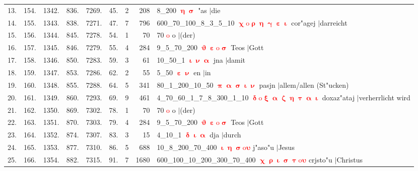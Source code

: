 \documentclass[a4paper,10pt,landscape]{article}
\begin{document}
\begin{tabular}{rrrrrrrrp{120mm}}
13.&154.&1342.&836.&7269.&45.&2&208&8\_200 \textcolor{red}{$\boldsymbol{\upeta\upsigma}$} "as $|$die\\
14.&155.&1343.&838.&7271.&47.&7&796&600\_70\_100\_8\_3\_5\_10 \textcolor{red}{$\boldsymbol{\upchi\mathrm{o}\uprho\upeta\upgamma\upepsilon\upiota}$} cor"agej $|$darreicht\\
15.&156.&1344.&845.&7278.&54.&1&70&70 \textcolor{red}{$\boldsymbol{\mathrm{o}}$} o $|$(der)\\
16.&157.&1345.&846.&7279.&55.&4&284&9\_5\_70\_200 \textcolor{red}{$\boldsymbol{\upvartheta\upepsilon\mathrm{o}\upsigma}$} Teos $|$Gott\\
17.&158.&1346.&850.&7283.&59.&3&61&10\_50\_1 \textcolor{red}{$\boldsymbol{\upiota\upnu\upalpha}$} jna $|$damit\\
18.&159.&1347.&853.&7286.&62.&2&55&5\_50 \textcolor{red}{$\boldsymbol{\upepsilon\upnu}$} en $|$in\\
19.&160.&1348.&855.&7288.&64.&5&341&80\_1\_200\_10\_50 \textcolor{red}{$\boldsymbol{\uppi\upalpha\upsigma\upiota\upnu}$} pasjn $|$allem/allen (St"ucken)\\
20.&161.&1349.&860.&7293.&69.&9&461&4\_70\_60\_1\_7\_8\_300\_1\_10 \textcolor{red}{$\boldsymbol{\updelta\mathrm{o}\upxi\upalpha\upzeta\upeta\uptau\upalpha\upiota}$} doxaz"ataj $|$verherrlicht wird\\
21.&162.&1350.&869.&7302.&78.&1&70&70 \textcolor{red}{$\boldsymbol{\mathrm{o}}$} o $|$(der)\\
22.&163.&1351.&870.&7303.&79.&4&284&9\_5\_70\_200 \textcolor{red}{$\boldsymbol{\upvartheta\upepsilon\mathrm{o}\upsigma}$} Teos $|$Gott\\
23.&164.&1352.&874.&7307.&83.&3&15&4\_10\_1 \textcolor{red}{$\boldsymbol{\updelta\upiota\upalpha}$} dja $|$durch\\
24.&165.&1353.&877.&7310.&86.&5&688&10\_8\_200\_70\_400 \textcolor{red}{$\boldsymbol{\upiota\upeta\upsigma\mathrm{o}\upsilon}$} j"aso"u $|$Jesus\\
25.&166.&1354.&882.&7315.&91.&7&1680&600\_100\_10\_200\_300\_70\_400 \textcolor{red}{$\boldsymbol{\upchi\uprho\upiota\upsigma\uptau\mathrm{o}\upsilon}$} crjsto"u $|$Christus\\
\end{tabular}
\newpage
\end{document}
